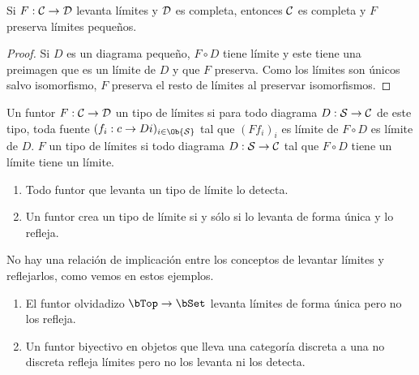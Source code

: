 \begin{theorem}
  Si $F:\mathcal{C}\to\mathcal{D}$ levanta límites y $\mathcal{D}$ es completa, entonces $\mathcal{C}$ es
  completa y $F$ preserva límites pequeños.
\end{theorem}
\begin{proof}
  Si $D$ es un diagrama pequeño, $F\circ D$ tiene límite y este tiene una
  preimagen que es un límite de $D$ y que $F$ preserva. Como los límites son
  únicos salvo isomorfismo, $F$ preserva el resto de límites al preservar
  isomorfismos.
\end{proof}

\begin{definition}
  Un funtor $F:\mathcal{C}\to\mathcal{D}$  un tipo de límites si para todo
  diagrama $D:\mathcal{S}\to\mathcal{C}$ de este tipo, toda fuente
  $(f_i:c\to Di)_{i\in\Ob{\cS}}$ tal que $(Ff_i)_i$ es límite de $F\circ D$ es
  límite de $D$. $F$  un tipo de límites si todo diagrama
  $D:\mathcal{S}\to\mathcal{C}$ tal que $F\circ D$ tiene un límite tiene un límite.
\end{definition}

\begin{proposition}\;
  \begin{enumerate}
  \item Todo funtor que levanta un tipo de límite lo detecta.
  \item Un funtor crea un tipo de límite si y sólo si lo levanta de forma única
    y lo refleja.
  \end{enumerate}
\end{proposition}

\begin{example}
  No hay una relación de implicación entre los conceptos de levantar límites y
  reflejarlos, como vemos en estos ejemplos.
  \begin{enumerate}
  \item El funtor olvidadizo $\bTop\to\bSet$ levanta límites de forma única pero
    no los refleja.
  \item Un funtor biyectivo en objetos que lleva una categoría discreta a una no
    discreta refleja límites pero no los levanta ni los detecta.
  \end{enumerate}
\end{example}


